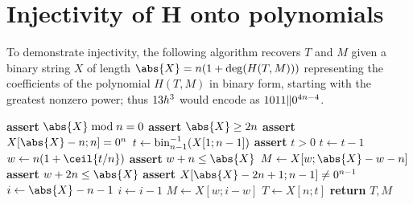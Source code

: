 \documentclass[hctr2.tex]{subfiles}
\begin{document}
\section{Injectivity of H onto polynomials}\label{injective}
To demonstrate injectivity, 
the following algorithm recovers \(T\) and \(M\) given
a binary string \(X\) of length \(\abs{X} = n (1 + \deg(H(T, M)))\)
representing the coefficients of 
the polynomial \(H(T, M)\) in binary form,
starting with the greatest nonzero power; thus
\(13h^3\) would encode as \(1011 \Vert 0^{4n -4}\).
\begin{algorithmic}[1]
    \State \textbf{assert} \(\abs{X} \bmod n = 0\)
    \State \textbf{assert} \(\abs{X} \geq 2n\)
    \State \textbf{assert} \(X[\abs{X} - n; n] = 0^n\)
    \State \(t \gets \operatorname{bin}^{-1}_{n-1}(X[1;n-1])\)
    \State \textbf{assert} \(t > 0\)
    \State \(t \gets t-1\)
    \State \(w \gets n(1 + \ceil{t/n})\)
        \State \textbf{assert} \(w + n \leq \abs{X}\)
        \State \(M \gets X[w;\abs{X}-w-n]\)
    \Else
        \State \textbf{assert} \(w + 2n \leq \abs{X}\)
        \State \textbf{assert} \(X[\abs{X}-2n+1; n-1] \neq 0^{n-1}\)
        \State \(i \gets \abs{X} - n - 1\)
            \State \(i \gets i - 1\)
        \EndWhile
        \State \(M \gets X[w;i - w]\)
    \EndIf
    \State \(T \gets X[n;t]\)
    \State \textbf{return} \(T, M\)
    \EndProcedure
\end{algorithmic}
\end{document}
